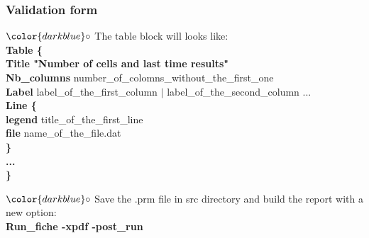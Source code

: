 \documentclass[10pt]{beamer}
\begin{document}
\begin{frame}
\frametitle{Validation form}
\begin{block}{}

\hspace{1cm} $\color{darkblue}\circ$ {\small{ The table block will looks like:\\
{\footnotesize{
\hspace{1.4cm} \textbf{Table \{} \\
\hspace{1.7cm} \textbf{Title "Number of cells and last time results"} \\
\hspace{1.7cm} \textbf{Nb\_columns} number\_of\_colomns\_without\_the\_first\_one \\
\hspace{1.7cm} \textbf{Label} label\_of\_the\_first\_column $|$ label\_of\_the\_second\_column ...\\
\hspace{1.7cm} \textbf{Line \{} \\
\hspace{2cm} \textbf{legend} title\_of\_the\_first\_line\\
\hspace{2cm} \textbf{file} name\_of\_the\_file.dat\\
\hspace{1.7cm} \textbf{\}} \\
\hspace{1.7cm} \textbf{...} \\
\hspace{1.4cm} \textbf{\}} \\
}}
}}

\hspace{1cm} $\color{darkblue}\circ$ {\small{ Save the .prm file in src directory and build the report with a new option:\\
\hspace{1.4cm} \textbf{Run\_fiche -xpdf -post\_run}
}}

\end{block}
\end{frame}
\end{document}
